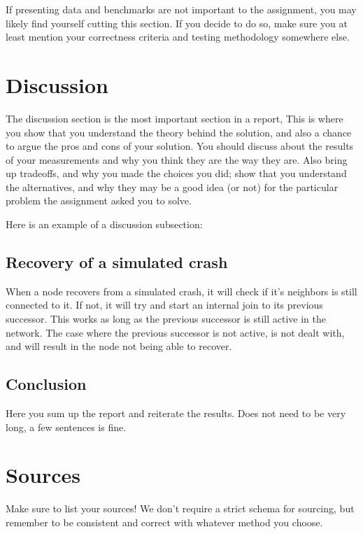 \documentclass{article}
\begin{document}
\begin{flushleft}
\bigskip

If presenting data and benchmarks are not important to the assignment, you may likely find yourself cutting this section. If you decide to do so, make sure you at least mention your correctness criteria and testing methodology somewhere else.

\section[Discussion]{Discussion}
The discussion section is the most important section in a report, This is where you show that you understand the theory behind the solution, and also a chance to argue the pros and cons of your solution. You should discuss about the results of your measurements and why you think they are the way they are. Also bring up tradeoffs, and why you made the choices you did; show that you understand the alternatives, and why they may be a good idea (or not) for the particular problem the assignment asked you to solve.

\bigskip

Here is an example of a discussion subsection: 

\subsection{Recovery of a simulated crash}
When a node recovers from a simulated crash, it will check if it's neighbors is still connected to it. If not, it will try and start an internal join to its previous successor. This works as long as the previous successor is still active in the network. The case where the previous successor is not active, is not dealt with, and will result in the node not being able to recover.   


\subsection{Conclusion}
Here you sum up the report and reiterate the results. Does not need to be very long, a few sentences is fine.

\section{Sources}
Make sure to list your sources! We don't require a strict schema for sourcing, but remember to be consistent and correct with whatever method you choose.

\bigskip


\end{flushleft}
\end{document}
